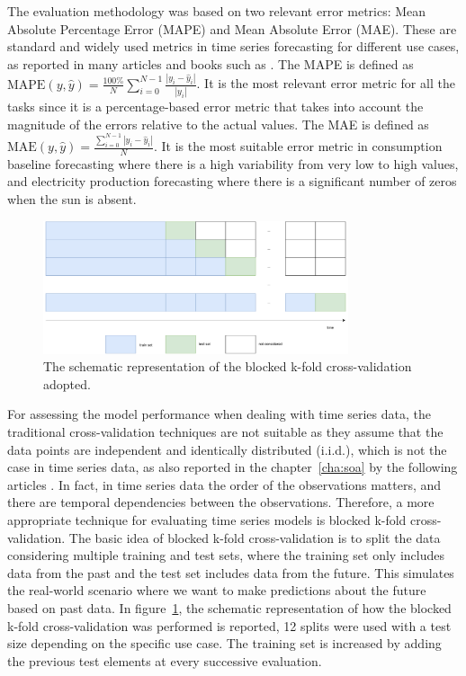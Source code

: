 The evaluation methodology was based on two relevant error metrics: Mean Absolute Percentage Error (MAPE) and Mean Absolute Error (MAE).
These are standard and widely used metrics in time series forecasting for different use cases, as reported in many articles and books such as \cite{armstrong2001principles, DEGOOIJER2006443, HYNDMAN2006679}.
The MAPE is defined as $\text{MAPE}(y, \hat{y}) = \frac{100\%}{N} \sum_{i=0}^{N - 1} \frac{|y_i - \hat{y}_i|}{|y_i|}$.
It is the most relevant error metric for all the tasks since it is a percentage-based error metric that takes into account the magnitude of the errors relative to the actual values.
The MAE is defined as $\text{MAE}(y, \hat{y}) = \frac{ \sum_{i=0}^{N - 1} |y_i - \hat{y}_i| }{N}$.
It is the most suitable error metric in consumption baseline forecasting where there is a high variability from very low to high values, and electricity production forecasting where there is a significant number of zeros when the sun is absent.

\begin{figure}[H]
\centering
\includegraphics[width=0.8\textwidth]{images/cross_validation}
\caption{The schematic representation of the blocked k-fold cross-validation adopted.}
\label{fig:crossvalidation}
\end{figure}

For assessing the model performance when dealing with time series data, the traditional cross-validation techniques are not suitable as they assume that the data points are independent and identically distributed (i.i.d.), which is not the case in time series data, as also reported in the chapter~\ref{cha:soa} by the following articles \cite{BERGMEIR2012192, Cerqueira2020}.
In fact, in time series data the order of the observations matters, and there are temporal dependencies between the observations.
Therefore, a more appropriate technique for evaluating time series models is blocked k-fold cross-validation.
The basic idea of blocked k-fold cross-validation is to split the data considering multiple training and test sets, where the training set only includes data from the past and the test set includes data from the future.
This simulates the real-world scenario where we want to make predictions about the future based on past data.
In figure~\ref{fig:crossvalidation}, the schematic representation of how the blocked k-fold cross-validation was performed is reported, 12 splits were used with a test size depending on the specific use case.
The training set is increased by adding the previous test elements at every successive evaluation.

